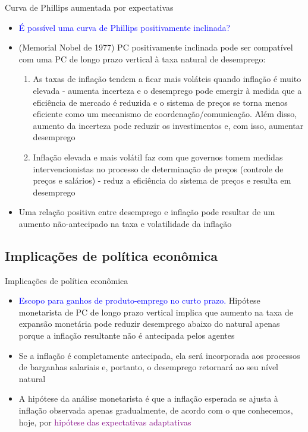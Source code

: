 \documentclass[10pt]{beamer}
\begin{document}
\begin{frame}{Curva de Phillips aumentada por expectativas}
    \begin{itemize}
        \item \textcolor{blue}{É possível uma curva de Phillips positivamente inclinada?}
        \bigskip
        \item (Memorial Nobel de 1977) PC positivamente inclinada pode ser compatível com uma PC de longo prazo vertical à taxa natural de desemprego:
        \bigskip
        \begin{enumerate}
            \item As taxas de inflação tendem a ficar mais voláteis quando inflação é muito elevada - aumenta incerteza e o desemprego pode emergir à medida que a eficiência de mercado é reduzida e o sistema de preços se torna menos eficiente como um mecanismo de coordenação/comunicação. Além disso, aumento da incerteza pode reduzir os investimentos e, com isso, aumentar desemprego
            \medskip
            \item Inflação elevada e mais volátil faz com que governos tomem medidas intervencionistas no processo de determinação de preços (controle de preços e salários) - reduz a eficiência do sistema de preços e resulta em desemprego
        \end{enumerate}
        \bigskip
        \item Uma relação positiva entre desemprego e inflação pode resultar de um aumento não-antecipado na taxa e volatilidade da inflação
    \end{itemize}    
\end{frame}

\subsection{Implicações de política econômica}
\begin{frame}{Implicações de política econômica}
    \begin{itemize}
        \item \textcolor{blue}{Escopo para ganhos de produto-emprego no curto prazo.} Hipótese monetarista de PC de longo prazo vertical implica que aumento na taxa de expansão monetária pode reduzir desemprego abaixo do natural apenas porque a inflação resultante não é antecipada pelos agentes
        \bigskip
        \item Se a inflação é completamente antecipada, ela será incorporada aos processos de barganhas salariais e, portanto, o desemprego retornará ao seu nível natural
        \bigskip
        \item A hipótese da análise monetarista é que a inflação esperada se ajusta à inflação observada apenas gradualmente, de acordo com o que conhecemos, hoje, por \textcolor{purple}{hipótese das expectativas adaptativas}
    \end{itemize}    
\end{frame}
\end{document}
